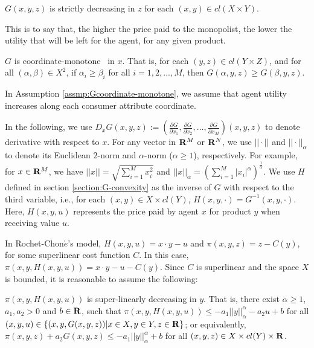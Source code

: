 \begin{assumption}\label{assmp:Gdecreasing}
	$G(x,y,z)$ is strictly decreasing in $z$ %
	for each $(x,y) \in cl(X \times Y)$.
\end{assumption}





This is to say that, the higher the price paid to the monopolist, the lower the utility that will be left for the agent, for any given product. %
\medskip


\begin{assumption}\label{assmp:Gcoordinate-monotone}
	$G$ is coordinate-monotone
	~in $x$. That is, for each $(y,z)\in cl(Y\times Z)$, and for all $ (\alpha, \beta) \in X^2$, if $\alpha_i\ge \beta_i$ for all $ i=1,2,...,M$, then $G(\alpha,y,z)\ge G(\beta, y,z)$.
\end{assumption}


In Assumption \ref{assmp:Gcoordinate-monotone}, we assume that agent utility increases along each consumer attribute coordinate.\medskip



 {In the following, we use  $D_x G(x,y,z) := (\frac{\partial G}{\partial x_1}, \frac{\partial G}{\partial x_2}, \dots, \frac{\partial G}{\partial x_M})(x,y,z)$ to denote derivative with respect to $x$. For any vector in ${\mathbf R}^M$ or ${\mathbf R}^N$, we use $||\cdot||$ and $||\cdot||_{\alpha}$ to denote its Euclidean  $2$-norm and $\alpha$-norm ($\alpha \ge 1$), respectively. For example, for $x\in {\mathbf R}^M$, we have $||x|| = \sqrt{\sum_{i=1}^{M} x_i^2}$ and $||x||_{\alpha} = (\sum_{i=1}^{M} |x_i|^{\alpha})^{\frac{1}{\alpha}}$. 
 We use $H$ defined in section \ref{section:G-convexity} as the inverse of $G$ with respect to the third variable, i.e., for each $(x, y) \in X\times cl(Y)$, $H(x, y, \cdot)= G^{-1}(x,y,\cdot)$. Here, $H(x,y,u)$ represents the price paid by agent $x$ for product $y$ when receiving value $u$.}\medskip

In Rochet-Chon$\acute{e}$'s model, $H(x,y,u) = x\cdot y -u$ and $\pi(x,y,z) = z-C(y)$, for some superlinear cost function $C$. In this case, $\pi(x,y,H(x,y,u)) = x\cdot y -u -C(y)$. Since $C$ is superlinear and the space $X$ is bounded, it is reasonable to assume the following:\medskip


\begin{assumption}\label{assmp:Gtech0}
	$\pi(x,y,H(x,y,u))$ is super-linearly decreasing in $y$. That is, there exist $\alpha \ge 1$, $a_1, a_2> 0$ and $b\in {\mathbf R}$, such that $\pi(x,y,H(x,y,u)) \le -a_1 ||y||_{\alpha}^{\alpha} - a_2 u +b$ for all $ (x, y, u)\in \{ (x,y, G(x,y,z))| x\in X, y\in Y, z\in {\mathbf R} \}$; or equivalently, $\pi(x,y,z) + a_2 G(x,y,z) \le -a_1 ||y||_{\alpha}^{\alpha}  +b$ for all $ (x, y, z)\in X\times cl(Y)\times {\mathbf R}$.
\end{assumption}


